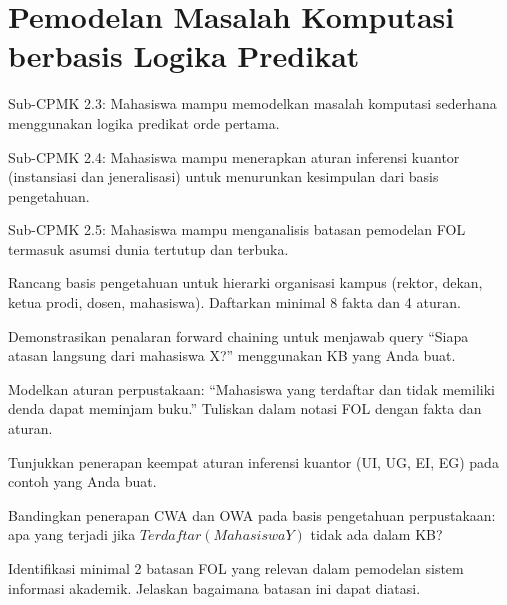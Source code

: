 \documentclass[../main]{subfiles}
\begin{document}
\chapter{Pemodelan Masalah Komputasi berbasis Logika Predikat}

\begin{subcpmk}
  \item Sub-CPMK 2.3: Mahasiswa mampu memodelkan masalah komputasi sederhana menggunakan logika predikat orde pertama.
  \item Sub-CPMK 2.4: Mahasiswa mampu menerapkan aturan inferensi kuantor (instansiasi dan jeneralisasi) untuk menurunkan kesimpulan dari basis pengetahuan.
  \item Sub-CPMK 2.5: Mahasiswa mampu menganalisis batasan pemodelan FOL termasuk asumsi dunia tertutup dan terbuka.
\end{subcpmk}










\begin{aktivitas}
  \item Rancang basis pengetahuan untuk hierarki organisasi kampus (rektor, dekan, ketua prodi, dosen, mahasiswa). Daftarkan minimal 8 fakta dan 4 aturan.
  \item Demonstrasikan penalaran forward chaining untuk menjawab query ``Siapa atasan langsung dari mahasiswa X?'' menggunakan KB yang Anda buat.
  \item Modelkan aturan perpustakaan: ``Mahasiswa yang terdaftar dan tidak memiliki denda dapat meminjam buku.'' Tuliskan dalam notasi FOL dengan fakta dan aturan.
  \item Tunjukkan penerapan keempat aturan inferensi kuantor (UI, UG, EI, EG) pada contoh yang Anda buat.
  \item Bandingkan penerapan CWA dan OWA pada basis pengetahuan perpustakaan: apa yang terjadi jika $Terdaftar(MahasiswaY)$ tidak ada dalam KB?
  \item Identifikasi minimal 2 batasan FOL yang relevan dalam pemodelan sistem informasi akademik. Jelaskan bagaimana batasan ini dapat diatasi.
\end{aktivitas}
\end{document}
